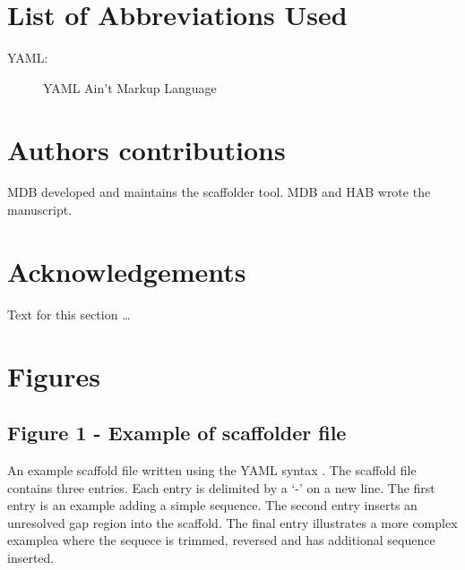 \documentclass[10pt]{bmc_article}
\newenvironment{bmcformat}{\begin{raggedright}\baselineskip20pt\sloppy\setboolean{publ}{false}}{\end{raggedright}\baselineskip20pt\sloppy}
\begin{document}
\begin{bmcformat}
\section*{List of Abbreviations Used} %

  \begin{description}
    \item[YAML:] YAML Ain't Markup Language\cite{yaml}
  \end{description}

\section*{Authors contributions} %

MDB developed and maintains the scaffolder tool. MDB and HAB wrote the
manuscript.

\section*{Acknowledgements} %
  Text for this section \ldots

\clearpage

{
   }     %


\clearpage

\section*{Figures} %

\subsection*{Figure 1 - Example of scaffolder file}

An example scaffold file written using the YAML syntax \cite{yaml}. The
scaffold file contains three entries. Each entry is delimited by a `-' on a new
line. The first entry is an example adding a simple sequence. The second entry
inserts an unresolved gap region into the scaffold. The final entry illustrates
a more complex examplea where the sequece is trimmed, reversed and has
additional sequence inserted. \pb

\end{bmcformat}
\end{document}
